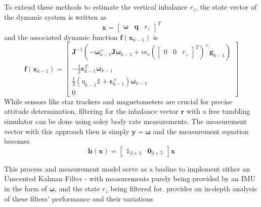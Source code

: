 To extend these methods to estimate the vertical inbalance $r_z$, the state vector of the dynamic system is written as 
\begin{equation}
    \bm{x} = \begin{bmatrix} \bm{\omega} & \bm{q} & r_z \end{bmatrix}^T
\end{equation}
and the associated dynamic function $\bm{f}(\bm{x}_{k-1})$ is
\begin{equation}
    \bm{f}(\bm{x}_{k-1}) = \begin{bmatrix}
        \bm{J}^{-1}(-\bm{\omega}_{k-1}^\times \bm{J\omega}_{k-1} + m_s
        (\begin{bmatrix}
            0 & 0 & r_z
        \end{bmatrix}^T)^{\times}\bm{g}_{k-1})
        \\
        -\frac{1}{2}\bm{\epsilon}_{k-1}^T\bm{\omega}_{k-1} 
        \\
        \frac{1}{2}(\eta_{k-1}\mathbb{1} + \bm{\epsilon}_{k-1}^{\times})\bm{\omega}_{k-1}
        \\
        0
    \end{bmatrix}
\end{equation}
 While sensors like star trackers and magnetometers are crucial for precise attitude determination, filtering for the inbalance vector $\bm{r}$ with a free tumbling simulator can be done using soley body rate measurements. The measurement vector with this approach then is simply $\bm{y}=\bm{\omega}$ and the measurement equation becomes
\begin{equation}
    \bm{h}(\bm{x})= \begin{bmatrix}
        \mathbb{1}_{3\times\,3} & \bm{0}_{3\times\,5}
    \end{bmatrix}\bm{x}
\end{equation}

This process and measurement model serve as a basline to implement either an Unscented Kalman Filter - with measurements purely being provided by an IMU in the form of $\bm{\omega}$, and the state $r_z$ being filtered for. \cite{silva_filtering_2018} provides an in-depth analysis of these filters' performance and their variations

